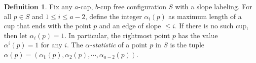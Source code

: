 \documentclass{amsart}
\theoremstyle{definition}
\newtheorem{theorem}[thm]{Theorem}
\newtheorem{definition}[thm]{Definition}
\numberwithin{thm}{section}
\begin{document}

\begin{definition}
Fix any $a$-cap, $b$-cup free configuration $S$ with a slope labeling.
For all $p \in S$ and $1 \leq i \leq a - 2$, define the integer $\alpha_i(p)$ as maximum length of a cup that ends with the point $p$ and an edge of slope $\leq i$.
If there is no such cup, then let $\alpha_i(p) = 1$.
In particular, the rightmost point $p$ has the value $\alpha^i(p) = 1$ for any $i$.
The \emph{$\alpha$-statistic} of a point $p$ in $S$ is 
the tuple $\alpha(p) = (\alpha_1(p), \alpha_2(p), \cdots, \alpha_{a-2}(p))$.
\end{definition}
\end{document}
